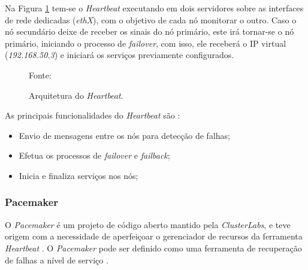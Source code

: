Na Figura \ref{fig:heartbeat} tem-se o \textit{Heartbeat} executando em dois servidores sobre as interfaces de rede dedicadas (\textit{ethX}), 
com o objetivo de cada nó monitorar o outro. Caso o nó secundário deixe de receber os sinais do nó primário, este irá tornar-se o nó primário, iniciando o
processo de \textit{failover}, com isso, ele receberá o \ac{IP} virtual (\textit{192.168.50.3}) e iniciará os serviços previamente configurados.
\begin{figure}[h!]
 \centering
 \caption{Arquitetura do \textit{Heartbeat}.}
 Fonte: \citet{zaminhani2008}
 \label{fig:heartbeat}
\end{figure}

As principais funcionalidades do \textit{Heartbeat} são \cite{clusterlabs}:
\begin{itemize}
 \item Envio de mensagens entre os nós para detecção de falhas;
 \item Efetua os processos de \textit{failover} e \textit{failback};
 \item Inicia e finaliza serviços nos nós;
\end{itemize}


\subsubsection{Pacemaker}
\label{section:pacemaker}
O \textit{Pacemaker} \cite{pacemaker} é um projeto de código aberto mantido pela \textit{ClusterLabs}, e teve origem com a necessidade de 
aperfeiçoar o gerenciador de recursos da ferramenta \textit{Heartbeat} \cite{heartbeat}. 
O \textit{Pacemaker} pode ser definido como uma ferramenta de recuperação de falhas a nível de serviço \cite{perkov2011}. 

